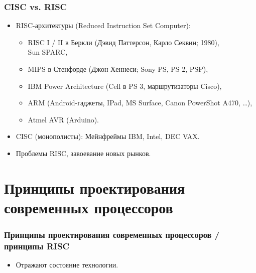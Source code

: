 \begin{frame}
\frametitle{CISC vs. RISC}
\begin{itemize}
    \item RISC-архитектуры (Reduced Instruction Set Computer):
    \begin{itemize}
        \item RISC I / II в Беркли (Дэвид Паттерсон, Карло Секвин; 1980),\\Sun SPARC,
        \item MIPS в Стенфорде (Джон Хеннеси; Sony PS, PS 2, PSP),
        \item IBM Power Architecture (Cell в PS 3, маршрутизаторы Cisco),
        \item ARM (Android-гаджеты, IPad, MS Surface, Canon PowerShot A470, …),
        \item Atmel AVR (Arduino).
    \end{itemize}
    \pause\item CISC (монополисты): Мейнфреймы IBM, Intel, DEC VAX.
    \pause\item Проблемы RISC, завоевание новых рынков.
\end{itemize}
\end{frame}

\section {Принципы проектирования современных процессоров}
\begin{frame}
\frametitle{Принципы проектирования современных процессоров / принципы RISC}
\pause
\begin{itemize}
    \item Отражают состояние технологии.
\end{itemize}

\end{frame}

